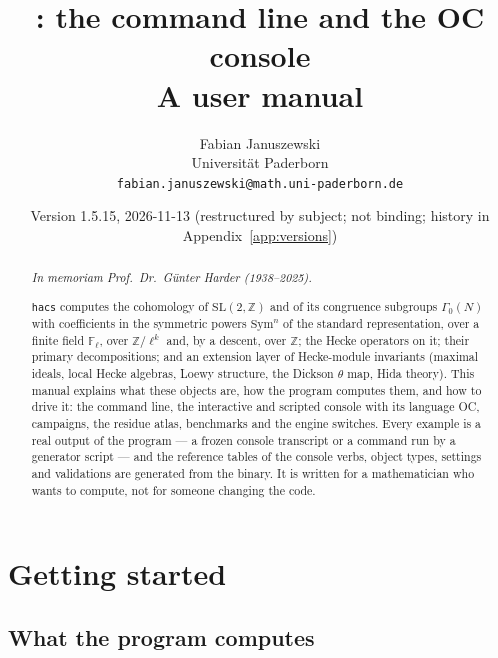 \documentclass[11pt,openany]{report}
\title{\app: the command line and the OC console\\[0.4ex]\large A user manual}
\author{Fabian Januszewski\\ Universit\"at Paderborn\\ \texttt{fabian.januszewski@math.uni-paderborn.de}}
\date{Version 1.5.15, 2026-11-13 (restructured by subject; not binding; history in Appendix~\ref{app:versions})}
\newcommand{\Z}{\mathbb{Z}}
\newcommand{\Fl}{\mathbb{F}_{\ell}}
\newcommand{\Sym}{\mathrm{Sym}}
\newcommand{\SL}{\mathrm{SL}}
\newcommand{\app}{\texttt{hacs}}
\begin{document}
\maketitle

\begin{abstract}
\begin{center}\emph{In memoriam Prof.\ Dr.\ G\"unter Harder (1938--2025).}\end{center}
\app{} computes the cohomology of $\SL(2,\Z)$ and of its congruence subgroups $\Gamma_0(N)$ with coefficients in the
symmetric powers $\Sym^n$ of the standard representation, over a finite field $\Fl$, over $\Z/\ell^k$ and, by a
descent, over $\Z$; the Hecke operators on it; their primary decompositions; and an extension layer of Hecke-module
invariants (maximal ideals, local Hecke algebras, Loewy structure, the Dickson $\theta$ map, Hida theory). This manual
explains what these objects are, how the program computes them, and how to drive it: the command line, the
interactive and scripted console with its language OC, campaigns, the residue atlas, benchmarks and the engine
switches. Every example is a real output of the program --- a frozen console transcript or a command run by a
generator script --- and the reference tables of the \CMNumVerbs{} console verbs, \CMNumTypes{} object types,
\CMNumSettings{} settings and \CMNumValidations{} validations are generated from the binary. It is written for a
mathematician who wants to compute, not for someone changing the code.
\end{abstract}

\tableofcontents

\chapter{Getting started}\label{ch:start}

\section{What the program computes}\label{sec:overview}
\end{document}
